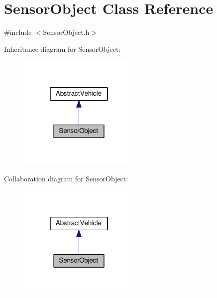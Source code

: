 \hypertarget{classSensorObject}{}\section{Sensor\+Object Class Reference}
\label{classSensorObject}


{\ttfamily \#include $<$Sensor\+Object.\+h$>$}



Inheritance diagram for Sensor\+Object\+:\nopagebreak
\begin{figure}[H]
\begin{center}
\leavevmode
\includegraphics[width=166pt]{classSensorObject__inherit__graph}
\end{center}
\end{figure}


Collaboration diagram for Sensor\+Object\+:\nopagebreak
\begin{figure}[H]
\begin{center}
\leavevmode
\includegraphics[width=166pt]{classSensorObject__coll__graph}
\end{center}
\end{figure}
